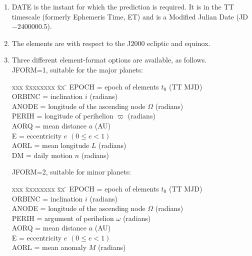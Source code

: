 \documentclass[11pt,twoside]{article}
\begin{document}
{
 \begin{enumerate}
  \item DATE is the instant for which the prediction is
        required.  It is in the TT timescale (formerly
        Ephemeris Time, ET) and is a
        Modified Julian Date (JD$-$2400000.5).
  \item The elements are with respect to
        the J2000 ecliptic and equinox.
  \item Three different element-format options are available, as
        follows. \\

        JFORM=1, suitable for the major planets:

        \begin{tabbing}
        xxx \= xxxxxxxx \= xx \= \kill
        \> EPOCH  \> = \> epoch of elements $t_0$ (TT MJD) \\
        \> ORBINC \> = \> inclination $i$ (radians) \\
        \> ANODE  \> = \> longitude of the ascending node $\Omega$ (radians) \\
        \> PERIH  \> = \> longitude of perihelion $\varpi$ (radians) \\
        \> AORQ   \> = \> mean distance $a$ (AU) \\
        \> E      \> = \> eccentricity $e$ $( 0 \leq e < 1 )$ \\
        \> AORL   \> = \> mean longitude $L$ (radians) \\
        \> DM     \> = \> daily motion $n$ (radians)
        \end{tabbing}

        JFORM=2, suitable for minor planets:

        \begin{tabbing}
        xxx \= xxxxxxxx \= xx \= \kill
        \> EPOCH  \> = \> epoch of elements $t_0$ (TT MJD) \\
        \> ORBINC \> = \> inclination $i$ (radians) \\
        \> ANODE  \> = \> longitude of the ascending node $\Omega$ (radians) \\
        \> PERIH  \> = \> argument of perihelion $\omega$ (radians) \\
        \> AORQ   \> = \> mean distance $a$ (AU) \\
        \> E      \> = \> eccentricity $e$ $( 0 \leq e < 1 )$ \\
        \> AORL   \> = \> mean anomaly $M$ (radians)
        \end{tabbing}


\end{enumerate}}
\end{document}

